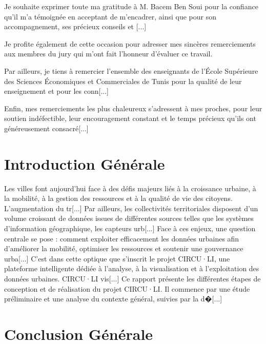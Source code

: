 \documentclass[12pt, a4paper]{report}
\begin{document}
Je souhaite exprimer toute ma gratitude à M. Bacem Ben Soui pour la confiance qu’il m’a témoignée en acceptant de m’encadrer, ainsi que pour son accompagnement, ses précieux conseils et [...]

Je profite également de cette occasion pour adresser mes sincères remerciements aux membres du jury qui m’ont fait l’honneur d’évaluer ce travail.

Par ailleurs, je tiens à remercier l’ensemble des enseignants de l’École Supérieure des Sciences Économiques et Commerciales de Tunis pour la qualité de leur enseignement et pour les conn[...]

Enfin, mes remerciements les plus chaleureux s’adressent à mes proches, pour leur soutien indéfectible, leur encouragement constant et le temps précieux qu’ils ont généreusement consacré[...]


\tableofcontents
\listoffigures
\listoftables

\chapter*{Introduction Générale}
Les villes font aujourd’hui face à des défis majeurs liés à la croissance urbaine, à la mobilité, à la gestion des ressources et à la qualité de vie des citoyens. L’augmentation du tr[...]
Par ailleurs, les collectivités territoriales disposent d’un volume croissant de données issues de différentes sources telles que les systèmes d’information géographique, les capteurs urb[...]
Face à ces enjeux, une question centrale se pose : comment exploiter efficacement les données urbaines afin d’améliorer la mobilité, optimiser les ressources et soutenir une gouvernance urba[...]
C’est dans cette optique que s’inscrit le projet CIRCU·LI, une plateforme intelligente dédiée à l’analyse, à la visualisation et à l’exploitation des données urbaines. CIRCU·LI vis[...]
Ce rapport présente les différentes étapes de conception et de réalisation du projet CIRCU·LI. Il commence par une étude préliminaire et une analyse du contexte général, suivies par la d�[...]







\chapter*{Conclusion Générale}
\end{document}
